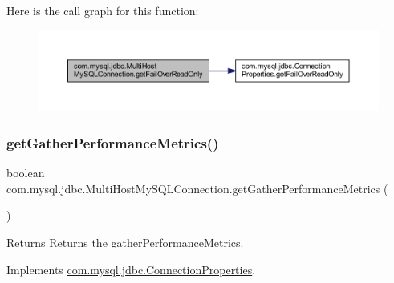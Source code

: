 Here is the call graph for this function\+:
\nopagebreak
\begin{figure}[H]
\begin{center}
\leavevmode
\includegraphics[width=350pt]{classcom_1_1mysql_1_1jdbc_1_1_multi_host_my_s_q_l_connection_a2fdb31070906a426372d786d4f931034_cgraph}
\end{center}
\end{figure}
\mbox{\label{classcom_1_1mysql_1_1jdbc_1_1_multi_host_my_s_q_l_connection_a5e3312dbc7d1e713c67aa90d1d7527be}} 
\subsubsection{\texorpdfstring{get\+Gather\+Performance\+Metrics()}{getGatherPerformanceMetrics()}}
{\footnotesize\ttfamily boolean com.\+mysql.\+jdbc.\+Multi\+Host\+My\+S\+Q\+L\+Connection.\+get\+Gather\+Performance\+Metrics (\begin{DoxyParamCaption}{ }\end{DoxyParamCaption})}

\begin{DoxyReturn}{Returns}
Returns the gather\+Performance\+Metrics. 
\end{DoxyReturn}


Implements \mbox{\hyperlink{interfacecom_1_1mysql_1_1jdbc_1_1_connection_properties_a90f58aa61c84d2072ba37c902aef8f9e}{com.\+mysql.\+jdbc.\+Connection\+Properties}}.

